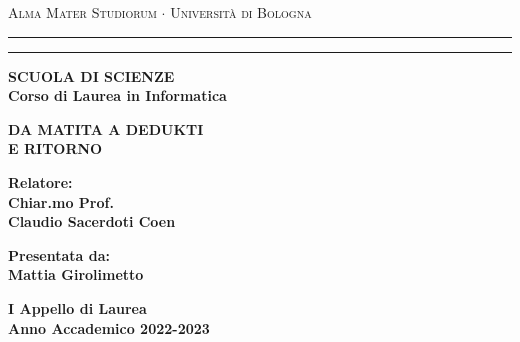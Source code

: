 \documentclass[12pt,a4paper]{mimosis}
\begin{document}
\begin{titlepage}
  \begin{center}
    {{
      \Large{\textsc{Alma Mater Studiorum $\cdot$ Universit\`a di Bologna}}
    }} \rule[0.1cm]{15.8cm}{0.1mm}
    \rule[0.5cm]{15.8cm}{0.6mm}
    {\small{\bf SCUOLA DI SCIENZE\\
    Corso di Laurea in Informatica}}
  \end{center}
  \vspace{15mm}
  \begin{center}
    {\LARGE{\bf DA MATITA A DEDUKTI}}\\
    \vspace{3mm}
    {\LARGE{\bf E RITORNO}}\\
  \end{center}
  \vspace{40mm}
  \par
  \noindent
  \begin{minipage}[t]{0.47\textwidth}
  {\large{\bf Relatore:\\
  Chiar.mo Prof.\\ %
  Claudio Sacerdoti Coen}}
  \end{minipage}
  \hfill
  \begin{minipage}[t]{0.47\textwidth}\raggedleft
  {\large{\bf Presentata da:\\
  Mattia Girolimetto}}
  \end{minipage}
  \vspace{20mm}
  \begin{center}
  {\large{\bf I Appello di Laurea\\%
  Anno Accademico 2022-2023}}%
  \end{center}
\end{titlepage}



\thispagestyle{empty}
\tableofcontents
\end{document}
